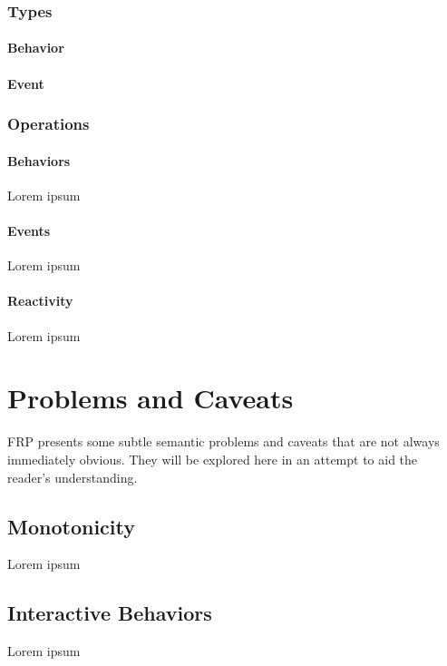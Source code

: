 \documentclass[12pt]{article}
\begin{document}
      \subsubsection{Types}
        \paragraph{Behavior}
        
        \paragraph{Event}
         
      \subsubsection{Operations}
        \paragraph{Behaviors}
          Lorem ipsum
          
        \paragraph{Events}
          Lorem ipsum
          
        \paragraph{Reactivity}
          Lorem ipsum
          
  \section{Problems and Caveats}
    FRP presents some subtle semantic problems and caveats that are not always immediately obvious.
    They will be explored here in an attempt to aid the reader's understanding.
     
    \subsection{Monotonicity}
    Lorem ipsum
    
    \subsection{Interactive Behaviors}
    Lorem ipsum
    
\end{document}

